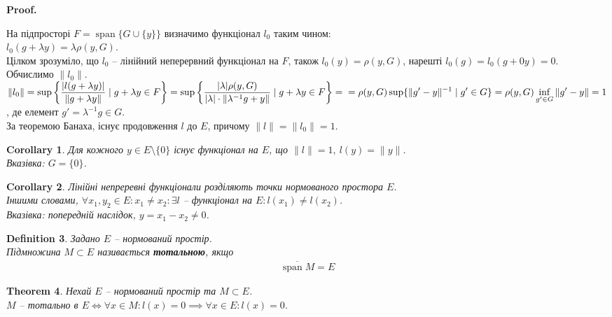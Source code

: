 \documentclass[a4paper, 10pt]{article}
\makeatletter
\theoremstyle{theoremdd}
\newtheorem{theorem}{Theorem}[subsection]
\theoremstyle{theoremdd}
\newtheorem{definition}[theorem]{Definition}
\theoremstyle{theoremdd}
\theoremstyle{theoremdd}
\theoremstyle{theoremdd}
\theoremstyle{theoremdd}
\theoremstyle{theoremdd}
\theoremstyle{theoremdd}
\newtheorem{corollary}[theorem]{Corollary}
\renewenvironment{proof}[1][Proof.\\]{\par
\pushQED{\hfill \qed}%
\normalfont \topsep6\p@\@plus6\p@\relax
\trivlist
\item\relax
{\bfseries
#1\@addpunct{.}}\hspace\labelsep\ignorespaces
}{%
\popQED\endtrivlist\@endpefalse
}
\DeclareMathOperator{\linspan}{span}
\makeatother
\begin{document}
\begin{proof}
На підпросторі $F = \linspan\{G \cup \{y\}\}$ визначимо функціонал $l_0$ таким чином:\\
$l_0(g + \lambda y) = \lambda \rho(y,G)$.\\
Цілком зрозуміло, що $l_0$ -- лінійний неперервний функціонал на $F$, також $l_0(y) = \rho(y,G)$, нарешті $l_0(g) = l_0(g+0y) = 0$. Обчислимо $\|l_0\|$.\\
$\|l_0\| = \displaystyle\sup \left\{ \dfrac{|l(g+\lambda y)|}{\|g+\lambda y\|} \mid g + \lambda y \in F \right\} = \sup\left\{ \dfrac{|\lambda| \rho(y,G)}{|\lambda| \cdot \|\lambda^{-1}g + y \|} \mid g+\lambda y \in F \right\} = \\ = \rho(y,G) \sup \{ \|g'-y\|^{-1} \mid g' \in G \} = \rho(y,G) \inf_{g' \in G} \|g'-y\| = 1$, де елемент $g' = \lambda^{-1}g \in G$.\\
За теоремою Банаха, існує продовження $l$ до $E$, причому $\|l\| = \|l_0\| = 1$.
\end{proof}

\begin{corollary}
Для кожного $y \in E \setminus \{0\}$ існує функціонал на $E$, що $\|l\| = 1,\ l(y) = \|y\|$.\\
\textit{Вказівка: $G = \{0\}$}.
\end{corollary}

\begin{corollary}
Лінійні непреревні функціонали розділяють точки нормованого простора $E$.\\
Іншими словами, $\forall x_1,y_2 \in E: x_1 \neq x_2: \exists l$ -- функціонал на $E: l(x_1) \neq l(x_2)$.\\
\textit{Вказівка: попередній наслідок, $y = x_1 - x_2 \neq 0$.}
\end{corollary}

\begin{definition}
Задано $E$ -- нормований простір.\\
Підмножина $M \subset E$ називається \textbf{тотальною}, якщо
\begin{align*}
\overline{\linspan{M}} = E
\end{align*}
\end{definition}

\begin{theorem}
Нехай $E$ -- нормований простір та $M \subset E$.\\
$M$ -- тотально в $E \iff \forall x \in M: l(x) = 0 \implies \forall x \in E: l(x) = 0$.
\end{theorem}
\end{document}
